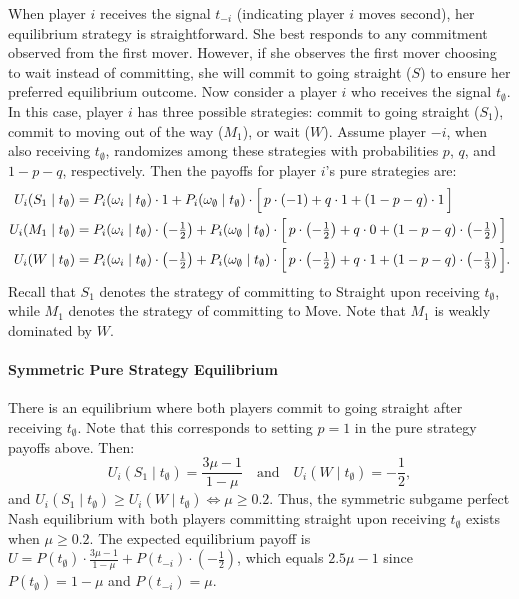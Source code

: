 \documentclass[main.tex]{subfiles}
\begin{document}
When player $i$ receives the signal $t_{-i}$ (indicating player $i$ moves second), her equilibrium strategy is straightforward. She best responds to any commitment observed from the first mover. However, if she observes the first mover choosing to wait instead of committing, she will commit to going straight ($S$) to ensure her preferred equilibrium outcome. Now consider a player $i$ who receives the signal $t_\emptyset$. In this case, player $i$ has three possible strategies: commit to going straight ($S_1$), commit to moving out of the way ($M_1$), or wait ($W$). Assume player $-i$, when also receiving $t_\emptyset$, randomizes among these strategies with probabilities $p$, $q$, and $1 - p - q$, respectively. Then the payoffs for player $i$’s pure strategies are:
\begin{align*}
U_i(S_{1} \mid t_\emptyset)
  &= P_i(\omega_i \mid t_\emptyset) \cdot 1
     + P_i(\omega_\emptyset \mid t_\emptyset) \cdot
       \Bigl[\, p \cdot (-1) + q \cdot 1 + (1 - p - q) \cdot 1 \,\Bigr]
\\
U_i(M_{1} \mid t_\emptyset)
  &= P_i(\omega_i \mid t_\emptyset) \cdot \left(-\tfrac{1}{2}\right)
     + P_i(\omega_\emptyset \mid t_\emptyset) \cdot
       \Bigl[\, p \cdot \left(-\tfrac{1}{2}\right) + q \cdot 0 + (1 - p - q) \cdot \left(-\tfrac{1}{2}\right) \,\Bigr]
\\
U_i(W \mid t_\emptyset)
  &= P_i(\omega_i \mid t_\emptyset) \cdot \left(-\tfrac{1}{2}\right)
     + P_i(\omega_\emptyset \mid t_\emptyset) \cdot
       \Bigl[\, p \cdot \left(-\tfrac{1}{2}\right) + q \cdot 1 + (1 - p - q) \cdot \left(-\tfrac{1}{3}\right) \,\Bigr].
\end{align*}
Recall that $S_1$ denotes the strategy of committing to Straight upon receiving $t_\emptyset$, while $M_1$ denotes the strategy of committing to Move. Note that $M_1$ is weakly dominated by $W$.

\paragraph{Symmetric Pure Strategy Equilibrium} There is an equilibrium where both players commit to going straight after receiving $t_\emptyset$. Note that this corresponds to setting $p=1$ in the pure strategy payoffs above. Then:
\begin{equation}
    U_i(S_1 \mid t_\emptyset) = \frac{3\mu - 1}{1 - \mu}
    \quad \text{and} \quad
    U_i(W \mid t_\emptyset) = -\frac{1}{2},
    \label{eq:alwaysstraightaftert_emptyset}
\end{equation}
and $U_i(S_1 \mid t_\emptyset)\geq U_i(W \mid t_\emptyset)\Leftrightarrow\mu\geq0.2$. Thus, the symmetric subgame perfect Nash equilibrium with both players committing straight upon receiving $t_\emptyset$ exists when $\mu\geq0.2$. 
The expected equilibrium payoff is $U=P(t_\emptyset)\cdot\frac{3\mu - 1}{1 - \mu}+P(t_{-i})\cdot(-\frac{1}{2})$, which equals $2.5\mu-1$ since $P(t_\emptyset)=1-\mu$ and $P(t_{-i})=\mu$.
 
\end{document}
